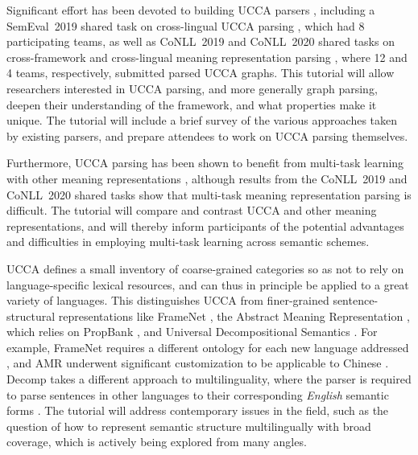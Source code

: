 \documentclass[11pt,a4paper,table]{article}
\begin{document}
Significant effort has been devoted to building UCCA parsers
\cite[][among others]{hershcovich2017a,jiang-19,zhang2019broad},
including a SemEval~2019 shared task
on cross-lingual UCCA parsing \citep{hershcovich2019shared},
which had 8 participating teams,
as well as CoNLL~2019 and CoNLL~2020 shared tasks on cross-framework and cross-lingual meaning representation
parsing \cite{Oep:Abe:Haj:19,Oep:Abe:Abz:20},
where 12 and 4 teams, respectively, submitted parsed UCCA graphs.
This tutorial will allow researchers interested in UCCA parsing, and more generally graph parsing, deepen their understanding of the framework, 
and what properties make it unique.
The tutorial will include a brief survey of the various approaches taken by existing parsers, and prepare attendees to work on UCCA parsing themselves.

Furthermore, UCCA parsing has been shown to benefit from multi-task learning
\cite{caruana1998multitask}
with other meaning representations \cite{hershcovich2018multitask}, although results from the CoNLL~2019 and CoNLL~2020 shared tasks \cite{Oep:Abe:Haj:19,Oep:Abe:Abz:20}
show that multi-task meaning representation parsing is difficult.
The tutorial will compare and contrast UCCA and other meaning representations,
and will thereby inform participants of the potential advantages and difficulties
in employing multi-task learning across semantic schemes.

UCCA defines a small inventory of coarse-grained categories so as not to rely on language-specific lexical resources, and  can thus in principle be applied to a great variety of languages. This distinguishes UCCA from finer-grained sentence-structural representations like FrameNet \citep{Baker:98}, the Abstract Meaning Representation \citep[AMR;][]{banarescu2013abstract}, which relies on PropBank \citep{Palmer:05},
and Universal Decompositional Semantics \citep[Decomp;][]{white2016universal}.
For example, FrameNet requires a different ontology for each new language addressed \cite{ohara2003japanese,You2005BuildingCF,borin20132,park2014frame,hayoun-elhadad-2016-hebrew,djemaa-etal-2016-corpus},
and AMR underwent significant customization to be applicable to Chinese
\cite{li-etal-2016-annotating}. Decomp takes a different approach to multilinguality, where the parser is required to parse sentences in other languages to their corresponding {\it English} semantic forms \citep{zhang2018cross}.
The tutorial will address contemporary issues in the field, such as
the question of how to represent semantic structure multilingually with
broad coverage, which is actively being explored from many angles.
\end{document}
